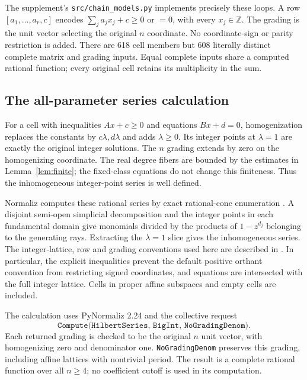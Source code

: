 \documentclass[11pt]{article}
\theoremstyle{remark}
\numberwithin{equation}{section}
\newcommand{\Z}{\mathbb Z}
\begin{document}
The supplement's \texttt{src/chain\_models.py} implements precisely these
loops. A row $[a_1,\ldots,a_r,c]$ encodes
$\sum_j a_j x_j+c\geq0$ or $=0$, with every $x_j\in\Z$.
The grading is the unit vector selecting the original $n$ coordinate.
No coordinate-sign or parity restriction is added.
There are 618 cell members but 608 literally distinct complete matrix and
grading inputs. Equal complete inputs share a computed rational function;
every original cell retains its multiplicity in the sum.

\subsection{The all-parameter series calculation}

For a cell with inequalities $A x+c\geq0$ and equations $B x+d=0$,
homogenization replaces the constants by $c\lambda,d\lambda$ and adds
$\lambda\geq0$. Its integer points at $\lambda=1$ are exactly the original
integer solutions. The $n$ grading extends by zero on the homogenizing
coordinate. The real degree fibers are bounded by the estimates in
Lemma~\ref{lem:finite}; the fixed-class equations do not change this
finiteness. Thus the inhomogeneous integer-point series is well defined.

Normaliz computes these rational series by exact rational-cone enumeration
\cite[Section~5.3]{BIS}. A disjoint semi-open simplicial decomposition and the
integer points in each fundamental domain give monomials divided by the
products of $1-z^{d_j}$ belonging to the generating rays.
Extracting the $\lambda=1$ slice gives the inhomogeneous series.
The integer-lattice, row and grading conventions used here are described in
\cite[Sections~2.1, 2.9, 4.1.18--4.1.19, 4.5.1 and 4.12--4.13]{Normaliz}.
In particular, the explicit inequalities prevent the default positive
orthant convention from restricting signed coordinates, and equations are
intersected with the full integer lattice. Cells in proper affine subspaces
and empty cells are included.

The calculation uses PyNormaliz 2.24 and the collective request
\[
 \texttt{Compute(HilbertSeries, BigInt, NoGradingDenom)}.
\]
Each returned grading is checked to be the original $n$ unit vector, with
homogenizing zero and denominator one.
\texttt{NoGradingDenom} preserves this grading, including affine lattices
with nontrivial period. The result is a complete rational function over all
$n\geq4$; no coefficient cutoff is used in its computation.
\end{document}
